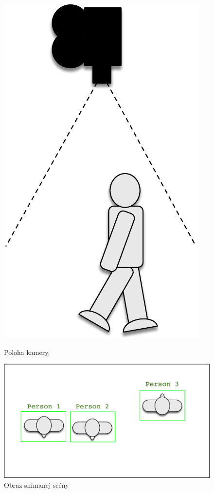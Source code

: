 \begin{figure}[H]
  \centering
  \begin{minipage}[b]{0.2\textwidth}
    \includegraphics[width=\textwidth]{images/conceptCameraPos}
    \caption{Poloha kamery.}
  \end{minipage}
  \hfill
  \begin{minipage}[b]{0.5\textwidth}
    \includegraphics[width=\textwidth]{images/conturesConcept}
    \caption{Obraz snímanej scény}
  \end{minipage}
\end{figure}

